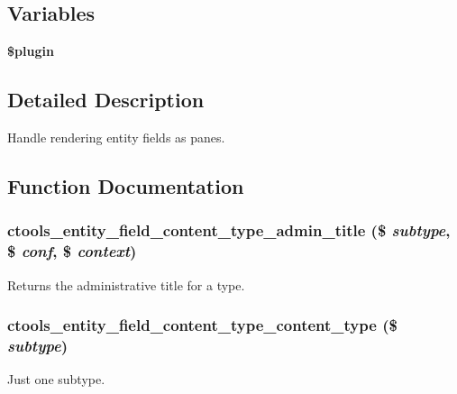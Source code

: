 \subsection*{Variables}
\begin{DoxyCompactItemize}
\item 
{\bfseries \$plugin}
\end{DoxyCompactItemize}


\subsection{Detailed Description}
Handle rendering entity fields as panes. 

\subsection{Function Documentation}
\hypertarget{entity__field_8inc_ae45b46517ede385c0ea11c59f0ea2e6b}{
\subsubsection[{ctools\_\-entity\_\-field\_\-content\_\-type\_\-admin\_\-title}]{\setlength{\rightskip}{0pt plus 5cm}ctools\_\-entity\_\-field\_\-content\_\-type\_\-admin\_\-title (\$ {\em subtype}, \/  \$ {\em conf}, \/  \$ {\em context})}}
\label{entity__field_8inc_ae45b46517ede385c0ea11c59f0ea2e6b}
Returns the administrative title for a type. \hypertarget{entity__field_8inc_a6502bcfaf5df20ed5417c11358270e23}{
\subsubsection[{ctools\_\-entity\_\-field\_\-content\_\-type\_\-content\_\-type}]{\setlength{\rightskip}{0pt plus 5cm}ctools\_\-entity\_\-field\_\-content\_\-type\_\-content\_\-type (\$ {\em subtype})}}
\label{entity__field_8inc_a6502bcfaf5df20ed5417c11358270e23}
Just one subtype.

